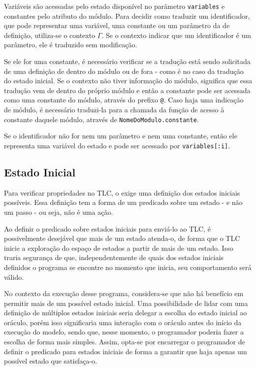 Variáveis são acessadas pelo estado disponível no parâmetro \texttt{variables} e
constantes pelo atributo do módulo. Para decidir como traduzir um identificador,
que pode representar uma variável,
uma constante ou um parâmetro da de definição, utiliza-se o contexto $\Gamma$.
Se o contexto indicar que um identificador é um parâmetro, ele é traduzido sem
modificação.

Se ele for uma constante, é necessário verificar se a tradução está
sendo solicitada de uma definição de dentro do módulo ou de fora - como é no
caso da tradução do estado inicial. Se o contexto não tiver informação do
módulo, significa que essa tradução vem de dentro do próprio módulo e então a
constante pode ser acessada como uma constante do módulo, através do prefixo
\texttt{@}. Caso haja uma indicação de módulo, é necessário traduzi-la para a
chamada da função de acesso à constante daquele módulo, através de
\texttt{NomeDoModulo.constante}.

Se o identificador não for nem um parâmetro e nem uma constante, então ele
representa uma variável do estado e pode ser acessado por \texttt{variables[:i]}.

\subsection{Estado Inicial}

Para verificar propriedades no TLC, o \TLA exige uma definição dos estados
iniciais possíveis. Essa definição tem a forma de um predicado sobre um estado
- e não um passo - ou seja, não é uma ação.

Ao definir o predicado sobre estados iniciais para enviá-lo ao TLC, é
possivelmente desejável que mais de um estado atenda-o, de forma que o TLC
inicie a exploração do espaço de estados a partir de mais de um estado. Isso
traria segurança de que, independentemente de quais dos estados iniciais definidos o
programa se encontre no momento que inicia, seu comportamento será válido.

No contexto da execução desse programa, considera-se que não há benefício em
permitir mais de um possível estado inicial. Uma possibilidade de lidar com uma
definição de múltiplos estados iniciais seria delegar a escolha do estado
inicial ao oráculo, porém isso significaria uma interação com o oráculo antes do
início da execução do modelo, sendo que, nesse momento, o programador poderia
fazer a escolha de forma mais simples. Assim, opta-se por encarregar o
programador de definir o predicado para estados iniciais de forma a garantir que
haja apenas um possível estado que satisfaça-o.

